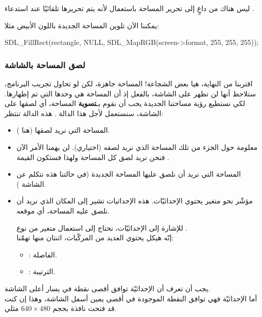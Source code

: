 \begin{information}
ليس هناك من داعٍ إلى تحرير المساحة
باستعمال
لأنه يتم تحريرها تلقائيًا عند استدعاء
.
\end{information}

يمكننا الآن تلوين المساحة الجديدة باللون الأبيض مثلا:

\begin{Csource}
SDL_FillRect(rectangle, NULL, SDL_MapRGB(screen->format, 255, 255, 255));
\end{Csource}

\subsubsection{لصق المساحة بالشاشة}

اقتربنا من النهاية، هيا بعض الشجاعة! المساحة جاهزة، لكن لو تحاول تجريب البرنامج، ستلاحظ أنها لن تظهر على الشاشة، بالفعل إذ أن المساحة
هي وحدها التي تم إظهارها. لكي نستطيع رؤية مساحتنا الجديدة يجب أن نقوم بـ\textbf{تسوية}
المساحة، أي لصقها على الشاشة، سنستعمل لأجل هذا الدالة 
.
 هذه الدالة تنتظر:
 
\begin{itemize}
	\item المساحة التي نريد لصقها (هنا 
	).
	\item معلومة حول الجزء من تلك المساحة الذي نريد لصقه (اختياري). لن يهمنا الأمر الآن فنحن نريد لصق كل المساحة ولهذا فستكون القيمة
	.
	\item المساحة التي نريد أن نلصق عليها المساحة الجديدة (في حالتنا هذه نتكلم عن الشاشة 
	).
	\item مؤشّر نحو متغير يحتوي الإحداثيّات. هذه الإحداثيات تشير إلى المكان الذي نريد أن نلصق عليه المساحة، أي موقعه.
	
للإشارة إلى الإحداثيّات، نحتاج إلى استعمال متغير من نوع 
.\\
إنّه هيكل يحتوي العديد من المركّبات، اثنتان منها تهمّنا:
	\begin{itemize}
		\item {}: 
الفاصلة.
		\item {}: 
الترتيبة. 
	\end{itemize}	
\end{itemize}

يجب أن تعرف أن الإحداثيّة
توافق أقصى نقطة في يسار أعلى الشاشة.\\
أما الإحداثيّة 
فهي توافق النقطة الموجودة في أقصى يمين أسفل الشاشة، وهذا إن كنت قد فتحت نافذة بحجم
$640 \times 480$
مثلي.

